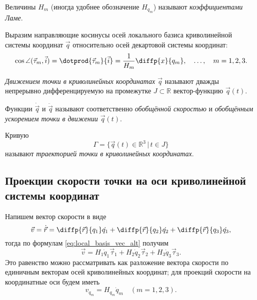 \begin{definition}
  Величины $H_m$ (иногда удобнее обозначение $H_{q_m}$) называют
  \textit{коэффициентами Ламе}.
\end{definition}

Выразим направляющие косинусы осей локального базиса криволинейной системы
координат $\vec{q}$ относительно осей декартовой системы координат:
\begin{equation}
  \cos\angle (\vec{\tau}_m, \vec{i}) = \dotprod{\vec{\tau}_m}{\vec{i}} =
    \frac{1}{H_m} \diffp{x}{{q_m}}, \quad \dots, \quad m = 1,2,3.
\end{equation}

\begin{definition}
  \textit{Движением точки в криволинейных координатах $\vec{q}$} называют
  дважды непрерывно дифференцируемую на промежутке $J \subset \mathbb{R}$
  вектор-функцию $\vec{q}(t)$.
\end{definition}

\begin{definition}
  Функции $\dot{\vec{q}}$ и $\ddot{\vec{q}}$ называют соответственно
  \textit{обобщённой скоростью} и \textit{обобщённым ускорением точки в
  движении $\vec{q}(t)$}.
\end{definition}

\begin{definition}
  Кривую
  \begin{equation*}
    \Gamma = \{ \vec{q}(t) \in \mathbb{R}^3 \, | \, t \in J \}
  \end{equation*}
  называют \textit{траекторией точки в криволинейных координатах}.
\end{definition}

\subsection{Проекции скорости точки на оси криволинейной системы координат}

Напишем вектор скорости в виде
\begin{equation}
  \label{eq:velocity_def}
  \vec{v} = \dot{\vec{r}} = \diffp{\vec{r}}{{q_1}} \dot{q_1} +
  \diffp{\vec{r}}{{q_2}} \dot{q_2} + \diffp{\vec{r}}{{q_3}} \dot{q_3},
\end{equation}
тогда по формулам \ref{eq:local_basis_vec_alt} получим
\begin{equation*}
  \vec{v} = H_1 \dot{q}_1 \vec{\tau}_1 + H_2 \dot{q}_2 \vec{\tau}_2 + H_3
  \dot{q}_3 \vec{\tau}_3.
\end{equation*}
Это равенство можно рассматривать как разложение вектора скорости по единичным
векторам осей криволинейных координат; для проекций скорости на координатные
оси будем иметь
\begin{equation}
  \label{eq:velocity_proj}
  v_{q_m} = H_{q_m} \dot{q}_m \quad (m = 1,2,3).
\end{equation}

